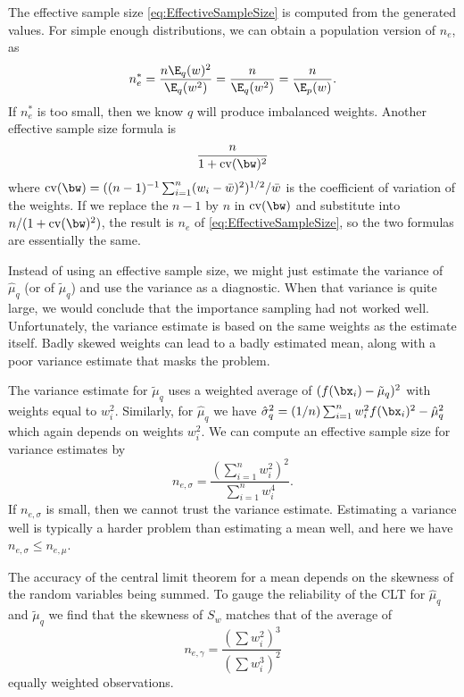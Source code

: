 The effective sample size \cref{eq:EffectiveSampleSize} is computed from the generated values. For simple enough distributions, we can obtain a population version of \(n_e\), as
\begin{equation}
	n_e^* = \frac{n \E_q(w)^2}{\E_q(w^2)} = \frac{n}{\E_q(w^2)} = \frac{n}{\E_p(w)}.
	\label{eq:PopulationESS}
\end{equation}
If \(n_e^*\) is too small, then we know \(q\) will produce imbalanced weights. Another effective sample size formula is
\begin{equation}
	\frac{n}{1 + \mathrm{cv}(\bw)^2}
	\label{eq:ESS_CV}
\end{equation}
where \(\mathrm{cv}(\bw) = ((n-1)^{-1} \sum_{i=1}^n (w_i - \bar{w})^2)^{1/2} / \bar{w}\) is the coefficient of variation of the weights. If we replace the \(n-1\) by \(n\) in \(\mathrm{cv}(\bw)\) and substitute into \(n/(1+\mathrm{cv}(\bw)^2)\), the result is \(n_e\) of \cref{eq:EffectiveSampleSize}, so the two formulas are essentially the same.

Instead of using an effective sample size, we might just estimate the variance of \(\hat{\mu}_q\) (or of \(\tilde{\mu}_q\)) and use the variance as a diagnostic. When that variance is quite large, we would conclude that the importance sampling had not worked well. Unfortunately, the variance estimate is based on the same weights as the estimate itself. Badly skewed weights can lead to a badly estimated mean, along with a poor variance estimate that masks the problem.

The variance estimate for \(\tilde{\mu}_q\) uses a weighted average of \((f(\bx_i) - \tilde{\mu}_q)^2\) with weights equal to \(w_i^2\). Similarly, for \(\hat{\mu}_q\) we have \(\hat{\sigma}_q^2 = (1/n) \sum_{i=1}^n w_i^2 f(\bx_i)^2 - \hat{\mu}_q^2\) which again depends on weights \(w_i^2\). We can compute an effective sample size for variance estimates by
\begin{equation}
	n_{e, \sigma} = \frac{(\sum_{i=1}^n w_i^2)^2}{\sum_{i=1}^n w_i^4}.
	\label{eq:ESS_Variance}
\end{equation}
If \(n_{e, \sigma}\) is small, then we cannot trust the variance estimate. Estimating a variance well is typically a harder problem than estimating a mean well, and here we have \(n_{e, \sigma} \leq n_{e, \mu}\).

The accuracy of the central limit theorem for a mean depends on the skewness of the random variables being summed. To gauge the reliability of the CLT for \(\hat{\mu}_q\) and \(\tilde{\mu}_q\) we find that the skewness of \(S_w\) matches that of the average of
\[
	n_{e, \gamma} = \frac{(\sum w_i^2)^3}{(\sum w_i^3)^2}
\]
equally weighted observations.

